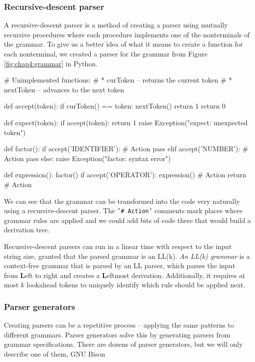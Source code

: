 \subsubsection*{Recursive-descent parser}
A recursive-descent parser is a method of creating a parser using mutually recursive procedures where each procedure implements one of the nonterminals
of the grammar. To give us a better idea of what it means to create a function for each nonterminal, we created a parser for the grammar from Figure
\ref{fig:chap4:grammar} in Python.
\begin{code}
# Unimplemented functions:
#   * curToken -- returns the current token
#   * nextToken -- advances to the next token

def accept(token):
    if curToken() == token:
        nextToken()
        return 1
    return 0

def expect(token):
    if accept(token):
        return 1
    raise Exception("expect: unexpected token")

def factor():
    if accept('IDENTIFIER'):
        # Action
        pass
    elif accept('NUMBER'):
        # Action
        pass 
    else:
        raise Exception("factor: syntax error")

def expression():
    factor()
    if accept('OPERATOR'):
        expression()
        # Action
        return
    # Action 
\end{code}

We can see that the grammar can be transformed into the code very naturally using a recursive-descent parser. The \texttt{'\# Action'} comments mark places where
grammar rules are applied and we could add bits of code there that would build a derivation tree.

Recursive-descent parsers can run in a linear time with respect to the input string size, granted that the parsed grammar is an LL(k). \emph{An LL(k) grammar} is
a context-free grammar that is parsed by an LL parser, which parses the input from \textbf{L}eft to right and creates a \textbf{L}eftmost derivation.
Additionally, it requires at most $k$ lookahead tokens to uniquely identify which rule should be applied next.

\subsubsection*{Parser generators}
Creating parsers can be a repetitive process -- applying the same patterns to different grammars. Parser generators solve this by generating parsers from grammar
specifications. There are dozens of parser generators, but we will only describe one of them, GNU Bison \cite{Bison}

